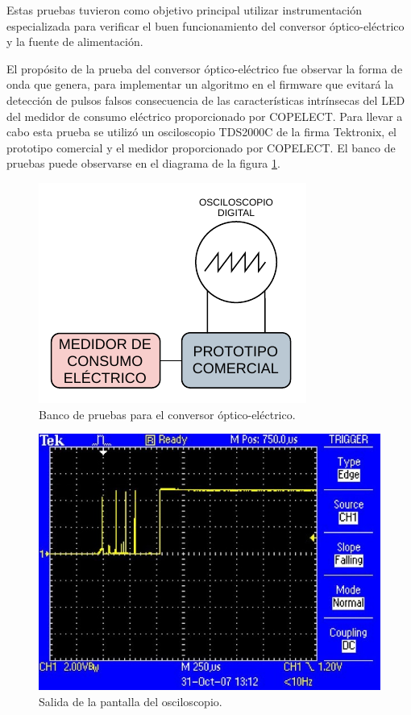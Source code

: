 Estas pruebas tuvieron como objetivo principal utilizar instrumentación especializada para verificar el buen funcionamiento del conversor óptico-eléctrico y la fuente de alimentación. 

El propósito de la prueba del conversor óptico-eléctrico fue observar la forma de onda que genera, para implementar un algoritmo en el firmware que evitará la detección de pulsos falsos consecuencia de las características intrínsecas del LED del medidor de consumo eléctrico proporcionado por COPELECT. Para llevar a cabo esta prueba se utilizó un osciloscopio TDS2000C de la firma Tektronix, el prototipo comercial y el medidor proporcionado por COPELECT. El banco de pruebas puede observarse en el diagrama de la figura \ref{fig:testHWBankCOE}.

\begin{figure}[ht]
	\centering
	\includegraphics[scale=1.2]{./Figures/test_pulses_bank.pdf}
	\caption{Banco de pruebas para el conversor óptico-eléctrico.}
	\label{fig:testHWBankCOE}
\end{figure}

\begin{figure}[ht]
	\centering
	\includegraphics[scale=0.5]{./Figures/pulses_debounce.jpg}
	\caption{Salida de la pantalla del osciloscopio.}
	\label{fig:testHWPhoto}
\end{figure}

